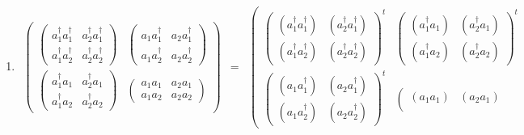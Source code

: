 \documentclass[aps,preprint]{revtex4}
\begin{document}
\begin{enumerate}
\begin{enumerate}
\item 
\begin{eqnarray}
\left( 
\begin{array}{cc}
\left( 
\begin{array}{cc}
a_{1}^{\dagger }a_{1}^{\dagger } & a_{2}^{\dagger }a_{1}^{\dagger } \\ 
a_{1}^{\dagger }a_{2}^{\dagger } & a_{2}^{\dagger }a_{2}^{\dagger }%
\end{array}%
\right) & \left( 
\begin{array}{cc}
a_{1}a_{1}^{\dagger } & a_{2}a_{1}^{\dagger } \\ 
a_{1}a_{2}^{\dagger } & a_{2}a_{2}^{\dagger }%
\end{array}%
\right) \\ 
\left( 
\begin{array}{cc}
a_{1}^{\dagger }a_{1} & a_{2}^{\dagger }a_{1} \\ 
a_{1}^{\dagger }a_{2} & a_{2}^{\dagger }a_{2}%
\end{array}%
\right) & \left( 
\begin{array}{cc}
a_{1}a_{1} & a_{2}a_{1} \\ 
a_{1}a_{2} & a_{2}a_{2}%
\end{array}%
\right)%
\end{array}%
\right) &=&\left( 
\begin{array}{cc}
\left( 
\begin{array}{cc}
\left( a_{1}^{\dagger }a_{1}^{\dagger }\right) & \left( a_{2}^{\dagger
}a_{1}^{\dagger }\right) \\ 
\left( a_{1}^{\dagger }a_{2}^{\dagger }\right) & \left( a_{2}^{\dagger
}a_{2}^{\dagger }\right)%
\end{array}%
\right) ^{t} & \left( 
\begin{array}{cc}
\left( a_{1}^{\dagger }a_{1}\right) & \left( a_{2}^{\dagger }a_{1}\right) \\ 
\left( a_{1}^{\dagger }a_{2}\right) & \left( a_{2}^{\dagger }a_{2}\right)%
\end{array}%
\right) ^{t} \\ 
\left( 
\begin{array}{cc}
\left( a_{1}a_{1}^{\dagger }\right) & \left( a_{2}a_{1}^{\dagger }\right) \\ 
\left( a_{1}a_{2}^{\dagger }\right) & \left( a_{2}a_{2}^{\dagger }\right)%
\end{array}%
\right) ^{t} & \left( 
\begin{array}{cc}
\left( a_{1}a_{1}\right) & \left( a_{2}a_{1}\right) \\ 

\end{array}
\end{array}
\end{eqnarray}
\end{enumerate}
\end{enumerate}
\end{document}
